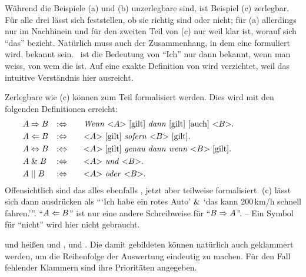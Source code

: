 Während die Beispiele (a) und (b) unzerlegbare  sind, ist Beispiel (c) zerlegbar.
Für alle drei  lässt sich feststellen, ob sie richtig sind oder nicht;
für (a) allerdings nur im Nachhinein und für den zweiten Teil von (c) nur weil klar ist, worauf sich \enquote{das} bezieht.
Natürlich muss auch der Zusammenhang, in dem eine  formuliert wird, bekannt sein.
\textZB\ ist die Bedeutung von \enquote{Ich} nur dann bekannt, wenn man weiss, von wem die  ist.
Auf eine exakte Definition von  wird verzichtet, weil das intuitive Verständnis hier ausreicht.

Zerlegbare  wie (c) können zum Teil formalisiert werden.
Dies wird mit den folgenden Definitionen erreicht:
%
\begin{align}
	& A \Rightarrow   B & :\Leftrightarrow & \qquad
	\text{\emph{Wenn} <$A$> [gilt] \emph{dann} [gilt] [auch] <$B$>.}
	\\
	& A \Leftarrow   B & :\Leftrightarrow & \qquad
	\text{<$A$> [gilt] \emph{sofern}          <$B$> [gilt].}
	\\
	& A \Leftrightarrow B & :\Leftrightarrow & \qquad
	\text{<$A$> [gilt] \emph{genau dann wenn} <$B$> [gilt].}
	\\
	& A \;\&\;   B & :\Leftrightarrow & \qquad
	\text{<$A$> \emph{und}  <$B$>.}
	\\
	& A \;||\;    B & :\Leftrightarrow & \qquad
	\text{<$A$> \emph{oder} <$B$>.}
	&&&&&&&&&&
\end{align}
%
Offensichtlich sind das alles ebenfalls , jetzt aber teilweise formalisiert.
(c) lässt sich dann ausdrücken als \enquote{\enquote{Ich habe ein rotes Auto} $\&$ \enquote{das kann 200\,km/h schnell fahren.}}.
\enquote{$A \Leftarrow B$} ist nur eine andere Schreibweise für \enquote{$B \Rightarrow A$}.
-- Ein Symbol für \enquote{nicht} wird hier nicht gebraucht.

\objqt{\metaandsym}\hidden{\glsIdxPl{\metaand}} und \objqt{\metaorsym}\hidden{\glsIdxPl{\metaor}} heißen \emph{} und ,  und  \emph{}.
Die damit gebildeten  können natürlich auch geklammert werden, um die Reihenfolge der Auswertung eindeutig zu machen.
Für den Fall fehlender Klammern sind ihre Prioritäten  angegeben.

